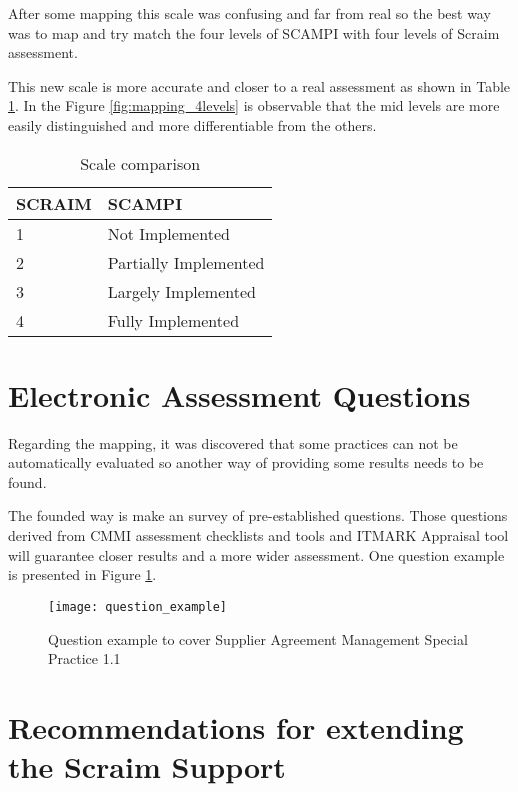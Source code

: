 After some mapping this scale was confusing and far from real so the best way was to map and try match the four levels of SCAMPI with four levels of Scraim assessment.

This new scale is more accurate and closer to a real assessment as shown in Table \ref{tab:rules}. In the Figure \ref{fig:mapping_4levels} is observable that the mid levels are more easily distinguished and more differentiable from the others.

\begin{table}[h]
	\centering
	\caption{Scale comparison}
	\begin{tabular}{|p{2cm}|p{4cm}|}
		\hline
		SCRAIM   & SCAMPI    \\
		\hline
		1 & Not Implemented\\
				\hline
				2 & Partially Implemented\\
				\hline
				3 & Largely Implemented\\
				\hline
				4 & Fully Implemented\\
				\hline
	\end{tabular}
	\label{tab:rules}
\end{table}

\section{Electronic Assessment Questions} \label{sec:question}

Regarding the mapping, it was discovered  that some practices can not be automatically evaluated so another way of providing some results needs to be found.

The founded way is make an survey of pre-established questions. Those questions derived from CMMI assessment checklists and tools and ITMARK Appraisal tool will guarantee closer results and a more wider assessment. One question example is presented in Figure \ref{fig:question_example}.

\begin{figure}[!htb]
	\begin{center}
		\leavevmode
		\texttt{[image: question\_example]}
		\caption{Question example to cover Supplier Agreement Management Special Practice 1.1}
		\label{fig:question_example}
	\end{center}
\end{figure}

\section{Recommendations for extending the Scraim Support}

